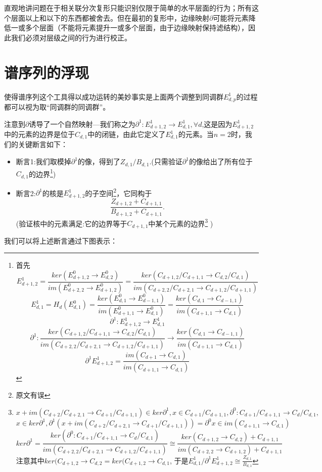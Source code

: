 \documentclass[a4paper,11pt,openany]{ctexart}
\begin{document}
直观地讲问题在于相关联分次复形只能识别仅限于简单的水平层面的行为；所有这个层面以上和以下的东西都被舍去。但在最初的复形中，边缘映射$\partial$可能将元素降低一或多个层面（不能将元素提升一或多个层面，由于边缘映射保持滤结构），因此我们必须对层级之间的行为进行校正。
\section{谱序列的浮现}
使得谱序列这个工具得以成功运转的美妙事实是上面两个调整到同调群$E^1_{d,p}$的过程都可以视为取“同调群的同调群”。

注意到$\partial$诱导了一个自然映射---我们称之为$\partial^1:E^1_{d+1,2}\to E_{d,1}^1,\forall d$,这是因为$E_{d+1,2}^1$中的元素的边界是位于$C_{d,1}$中的闭链，由此它定义了$E_{d,1}^1$的元素。当$n=2$时，我们的关键断言如下：

\begin{itemize}
  \item 断言1:我们取模掉$\partial^1$的像，得到了$Z_{d,1}/B_{d,1}$.(只需验证$\partial^1$的像给出了所有位于$C_{d,1}$的边界\footnote{首先\[E^1_{d+1,2}=\frac{ker(E^0_{d+1,2}\to E_{d,2}^0)}{im(E^0_{d+2,2}\to E_{d+1,2}^0)}=\frac{ker(C_{d+1,2}/C_{d+1,1}\to C_{d,2}/C_{d,1})}{im(C_{d+2,2}/C_{d+2,1}\to C_{d+1,2}/C_{d+1,1})}\]
      \[E^{1}_{d,1}=H_d(E^0_{d,1})=\frac{ker(E^0_{d,1}\to E_{d-1,1}^0)}{im(E^0_{d+1,1}\to E_{d,1}^0)}=\frac{ker(C_{d,1}\to C_{d-1,1})}{im(C_{d+1,1}\to C_{d,1})}\]
      \[\partial^1:E^1_{d+1,2}\to E_{d,1}^1\]
      \[\partial^1:\frac{ker(C_{d+1,2}/C_{d+1,1}\to C_{d,2}/C_{d,1})}{im(C_{d+2,2}/C_{d+2,1}\to C_{d+1,2}/C_{d+1,1})}\to\frac{ker(C_{d,1}\to C_{d-1,1})}{im(C_{d+1,1}\to C_{d,1})}\]
      \[\partial^1 E_{d+1,2}^1 =\frac{im(C_{d+1}\to C_{d,1})}{im(C_{d+1,1}\to C_{d,1})}\]

      })
  \item 断言2:$\partial^1$的核是$E_{d+1,2}^1$的子空间\footnote{原文有误}，它同构于
  \[\frac{Z_{d+1,2}+C_{d+1,1}}{B_{d+1,2}+C_{d+1,1}}.\](验证核中的元素满足:它的边界等于$C_{d+1,1}$中某个元素的边界\footnote{$x+im(C_{d+2}/C_{d+2,1}\to C_{d+1}/C_{d+1,1})\in ker\partial^1,x\in C_{d+1}/C_{d+1,1},\partial^0:C_{d+1}/C_{d+1,1}\to C_{d}/C_{d,1},$
  $$ x \in ker\partial^1 ,\partial^1(x+im(C_{d+2}/C_{d+2,1}\to C_{d+1}/C_{d+1,1}))=\partial^0x\in im(C_{d+1,1}\to C_{d,1})$$
  \[ker\partial^1=\frac{ker(\partial^0:C_{d+1}/C_{d+1,1}\to C_{d}/C_{d,1})}{im(C_{d+2,2}/C_{d+2,1}\to C_{d+1,2}/C_{d+1,1})} \cong \frac{ker(C_{d+1,2}\to C_{d,2})+C_{d+1,1}}{im(C_{d+2,2}\to C_{d+1,2})+C_{d+1,1}}\]
  注意其中$ker(C_{d+1,2}\to C_{d,2}=ker(C_{d+1,2}\to C_{d,1}$,
  于是$E^{1}_{d,1}/\partial^1 E_{d+1,2}^1 \cong \frac{Z_{d,1}}{B_{d,1}}$}
)
\end{itemize}
我们可以将上述断言通过下图表示：
\end{document}
